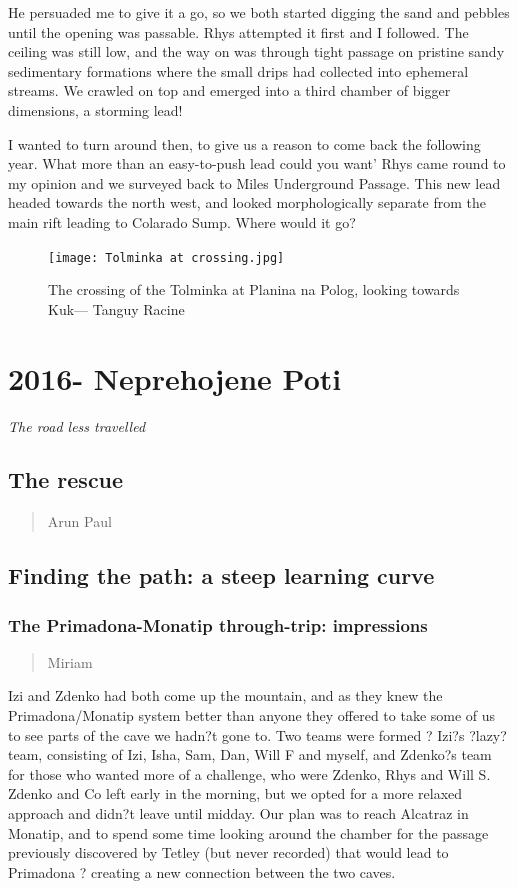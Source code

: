 \documentclass[onecolumn]{book}
\begin{document}
He persuaded me to give it a go, so we both started digging the sand and pebbles until the opening was passable. Rhys attempted it first and I followed. The ceiling was still low, and the way on was through tight passage on pristine sandy sedimentary formations where the small drips had collected into ephemeral streams. We crawled on top and emerged into a third chamber of bigger dimensions, a storming lead! 

I wanted to turn around then, to give us a reason to come back the following year. What more than an easy-to-push lead could you want' Rhys came round to my opinion and we surveyed back to Miles Underground Passage. This new lead headed towards the north west, and looked morphologically separate from the main rift leading to Colarado Sump. Where would it go?

\begin{figure}[h]
\centering
\texttt{[image: Tolminka at crossing.jpg]}
\caption{The crossing of the Tolminka at Planina na Polog, looking towards Kuk--- Tanguy Racine}
\label{tolminkapolog}
\end{figure}

\chapter{2016- Neprehojene Poti} 
\begin{flushright}
\huge \it The road less travelled
\end{flushright}

\section{The rescue}
 \begin{verse}
Arun Paul
\end{verse}

\section{Finding the path: a steep learning curve}
\subsection{The Primadona-Monatip through-trip: impressions}
 \begin{verse}
Miriam
\end{verse}
Izi and Zdenko had both come up the mountain, and as they knew the Primadona/Monatip system better than anyone they offered to take some of us to see parts of the cave we hadn?t gone to. Two teams were formed ? Izi?s ?lazy? team, consisting of Izi, Isha, Sam, Dan, Will F and myself, and Zdenko?s team for those who wanted more of a challenge, who were Zdenko, Rhys and Will S. Zdenko and Co left early in the morning, but we opted for a more relaxed approach and didn?t leave until midday. Our plan was to reach Alcatraz in Monatip, and to spend some time looking around the chamber for the passage previously discovered by Tetley (but never recorded) that would lead to Primadona ? creating a new connection between the two caves.
\end{document}
